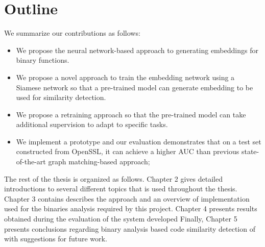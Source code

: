  

\section{Outline}
We summarize our contributions as follows:

\begin{itemize}
	\item We propose the neural network-based approach to generating embeddings for binary functions.
	\item We propose a novel approach to train the embedding network using a Siamese network so that a pre-trained model can generate embedding to be used for similarity detection.
	\item We propose a retraining approach so that the pre-trained 	model can take additional supervision to adapt to specific tasks.
	\item We implement a prototype and our evaluation demonstrates that on a test set constructed from OpenSSL, it can achieve a higher AUC than previous state-of-the-art graph matching-based approach;
\end{itemize}


The rest of the thesis is organized as follows. Chapter 2 gives detailed introductions to several different topics that is used throughout the thesis. Chapter 3 contains describes the approach and an overview of implementation used for the binaries analysis required by this project. Chapter 4 presents results obtained during the evaluation of the system developed Finally, Chapter 5 presents conclusions regarding binary analysis based code similarity detection of with suggestions for future work.
